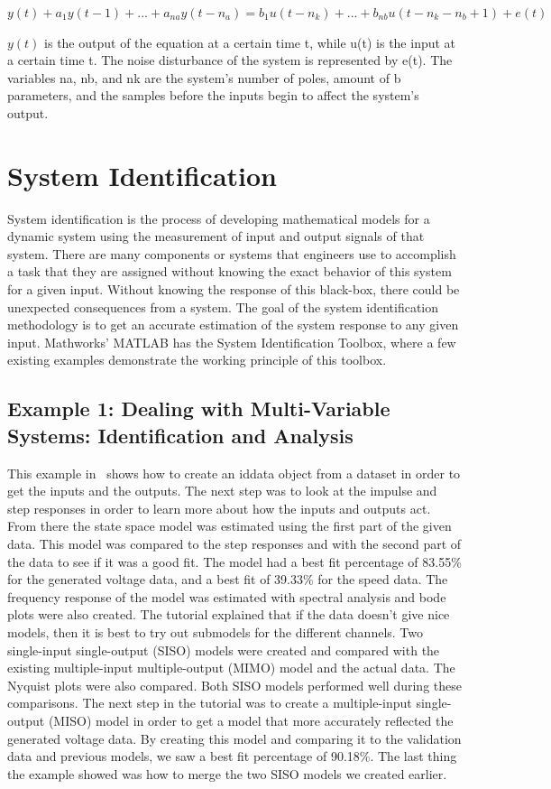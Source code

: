 \documentclass[letterpaper,12pt]{article}   %
\begin{document}
$y(t) + a_1y(t - 1) +...+a_{na}y(t - n_{a}) = b_{1}u(t-n_{k})+...+b_{nb}u(t - n_{k}-n_{b}+1) + e(t)$

$y(t)$ is the output of the equation at a certain time t, while u(t) is the input at a certain time t. The noise disturbance of the system is represented by e(t). The variables na, nb, and nk are the system’s number of poles, amount of b parameters, and the samples before the inputs begin to affect the system’s output.



\section{System Identification}

System identification is the process of developing mathematical models for a dynamic system using the measurement of input and output signals of that system. There are many components or systems that engineers use to accomplish a task that they are assigned without knowing the exact behavior of this system for a given input. Without knowing the response of this black-box, there could be unexpected consequences from a system. The goal of the system identification methodology is to get an accurate estimation of the system response to any given input. Mathworks' MATLAB has the System Identification Toolbox, where a few existing examples demonstrate the working principle of this toolbox.

\subsection{Example 1: Dealing with Multi-Variable Systems: Identification and Analysis}
\label{sec:sysID-Example1}

This example in~\cite{example1} shows how to create an iddata object from a dataset in order to get the inputs and the outputs. The next step was to look at the impulse and step responses in order to learn more about how the inputs and outputs act. From there the state space model was estimated using the first part of the given data. This model was compared to the step responses and with the second part of the data to see if it was a good fit. The model had a best fit percentage of 83.55\% for the generated voltage data, and a best fit of 39.33\% for the speed data. The frequency response of the model was estimated with spectral analysis and bode plots were also created. The tutorial explained that if the data doesn’t give nice models, then it is best to try out submodels for the different channels. Two single-input single-output (SISO) models were created and compared with the existing multiple-input multiple-output (MIMO) model and the actual data. The Nyquist plots were also compared. Both SISO models performed well during these comparisons. The next step in the tutorial was to create a multiple-input single-output (MISO) model in order to get a model that more accurately reflected the generated voltage data. By creating this model and comparing it to the validation data and previous models, we saw a best fit percentage of 90.18\%. The last thing the example showed was how to merge the two SISO models we created earlier.
\end{document}
